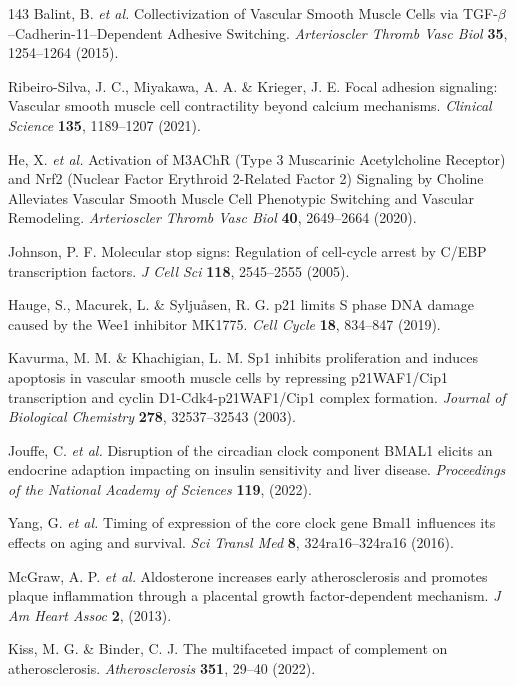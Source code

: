 \documentclass[12pt]{article}
\begin{document}
\begin{thebibliography}{143}
 Balint, B. \textit{et al.} Collectivization of Vascular Smooth Muscle Cells via TGF-$\beta$--Cadherin-11--Dependent Adhesive Switching. \textit{Arterioscler Thromb Vasc Biol} \textbf{35}, 1254--1264 (2015).

 Ribeiro-Silva, J. C., Miyakawa, A. A. \& Krieger, J. E. Focal adhesion signaling: Vascular smooth muscle cell contractility beyond calcium mechanisms. \textit{Clinical Science} \textbf{135}, 1189--1207 (2021).

 He, X. \textit{et al.} Activation of M3AChR (Type 3 Muscarinic Acetylcholine Receptor) and Nrf2 (Nuclear Factor Erythroid 2-Related Factor 2) Signaling by Choline Alleviates Vascular Smooth Muscle Cell Phenotypic Switching and Vascular Remodeling. \textit{Arterioscler Thromb Vasc Biol} \textbf{40}, 2649--2664 (2020).

 Johnson, P. F. Molecular stop signs: Regulation of cell-cycle arrest by C/EBP transcription factors. \textit{J Cell Sci} \textbf{118}, 2545--2555 (2005).

 Hauge, S., Macurek, L. \& Syljuåsen, R. G. p21 limits S phase DNA damage caused by the Wee1 inhibitor MK1775. \textit{Cell Cycle} \textbf{18}, 834--847 (2019).

 Kavurma, M. M. \& Khachigian, L. M. Sp1 inhibits proliferation and induces apoptosis in vascular smooth muscle cells by repressing p21WAF1/Cip1 transcription and cyclin D1-Cdk4-p21WAF1/Cip1 complex formation. \textit{Journal of Biological Chemistry} \textbf{278}, 32537--32543 (2003).

 Jouffe, C. \textit{et al.} Disruption of the circadian clock component BMAL1 elicits an endocrine adaption impacting on insulin sensitivity and liver disease. \textit{Proceedings of the National Academy of Sciences} \textbf{119}, (2022).

 Yang, G. \textit{et al.} Timing of expression of the core clock gene Bmal1 influences its effects on aging and survival. \textit{Sci Transl Med} \textbf{8}, 324ra16--324ra16 (2016).

 McGraw, A. P. \textit{et al.} Aldosterone increases early atherosclerosis and promotes plaque inflammation through a placental growth factor-dependent mechanism. \textit{J Am Heart Assoc} \textbf{2}, (2013).

 Kiss, M. G. \& Binder, C. J. The multifaceted impact of complement on atherosclerosis. \textit{Atherosclerosis} \textbf{351}, 29--40 (2022).


\end{thebibliography}
\end{document}
